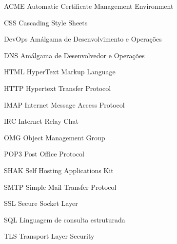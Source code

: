\begin{siglas}
  \item[ACME] Automatic Certificate Management Environment
  \item[CSS] Cascading Style Sheets
  \item[DevOps] Amálgama de Desenvolvimento e Operações
  \item[DNS] Amálgama de Desenvolvedor e Operações
  \item[HTML] HyperText Markup Language
  \item[HTTP] Hypertext Transfer Protocol
  \item[IMAP] Internet Message Access Protocol
  \item[IRC] Internet Relay Chat
  \item[OMG] Object Management Group
  \item[POP3] Post Office Protocol 
  \item[SHAK] Self Hosting Applications Kit
  \item[SMTP] Simple Mail Transfer Protocol
  \item[SSL] Secure Socket Layer
  \item[SQL] Linguagem de consulta estruturada
  \item[TLS] Transport Layer Security
\end{siglas}
